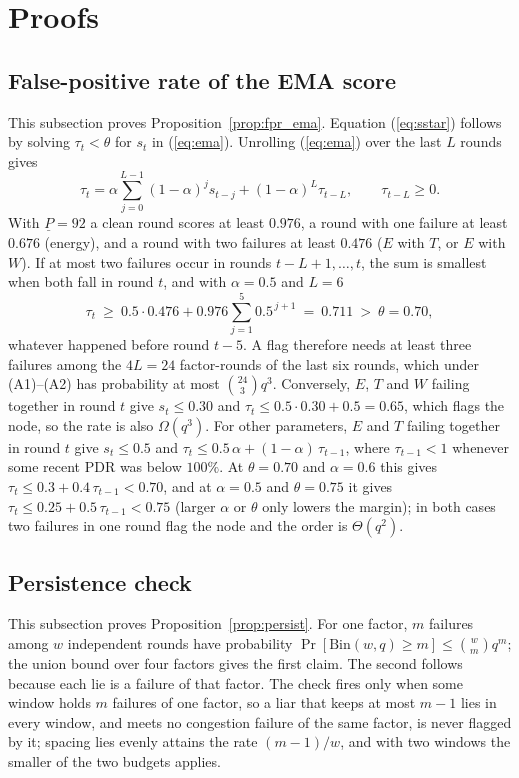
\appendices
\section{Proofs}
\label{app:proofs}

\subsection{False-positive rate of the EMA score}
This subsection proves Proposition~\ref{prop:fpr_ema}.
Equation (\ref{eq:sstar}) follows by solving $\tau_t<\theta$ for $s_t$
in (\ref{eq:ema}).  Unrolling (\ref{eq:ema}) over the last $L$ rounds
gives
\[
\tau_t=\alpha\sum_{j=0}^{L-1}(1-\alpha)^{j}s_{t-j}+(1-\alpha)^{L}\tau_{t-L},
\qquad \tau_{t-L}\ge 0 .
\]
With $\underline P=92$ a clean round scores at least $0.976$, a round
with one failure at least $0.676$ (energy), and a round with two
failures at least $0.476$ ($E$ with $T$, or $E$ with $W$).  If at most
two failures occur in rounds $t-L+1,\dots,t$, the sum is smallest when
both fall in round $t$, and with $\alpha=0.5$ and $L=6$
\[
\tau_t\ \ge\ 0.5\cdot0.476+0.976\sum_{j=1}^{5}0.5^{\,j+1}
\ =\ 0.711\ >\ \theta=0.70,
\]
whatever happened before round $t-5$.  A flag therefore needs at
least three failures among the $4L=24$ factor-rounds of the last six
rounds, which under (A1)--(A2) has probability at most
$\binom{24}{3}q^{3}$.  Conversely, $E$, $T$ and $W$ failing together
in round $t$ give $s_t\le0.30$ and $\tau_t\le0.5\cdot0.30+0.5=0.65$,
which flags the node, so the rate is also $\Omega(q^{3})$.
For other parameters, $E$ and $T$ failing together in round $t$ give
$s_t\le0.5$ and $\tau_t\le0.5\,\alpha+(1-\alpha)\,\tau_{t-1}$, where
$\tau_{t-1}<1$ whenever some recent PDR was below $100\%$.  At
$\theta=0.70$ and $\alpha=0.6$ this gives $\tau_t\le0.3+0.4\,\tau_{t-1}<0.70$,
and at $\alpha=0.5$ and $\theta=0.75$ it gives
$\tau_t\le0.25+0.5\,\tau_{t-1}<0.75$ (larger $\alpha$ or $\theta$ only
lowers the margin); in both cases two failures in one round flag the
node and the order is $\Theta(q^{2})$.

\subsection{Persistence check}
This subsection proves Proposition~\ref{prop:persist}.
For one factor, $m$ failures among $w$ independent rounds have
probability $\Pr[\mathrm{Bin}(w,q)\ge m]\le\binom{w}{m}q^{m}$; the union
bound over four factors gives the first claim.  The second follows
because each lie is a failure of that factor.  The check fires only
when some window holds $m$ failures of one factor, so a liar that
keeps at most $m-1$ lies in every window, and meets no congestion
failure of the same factor, is never flagged by it; spacing lies
evenly attains the rate $(m-1)/w$, and with two windows the smaller
of the two budgets applies.

